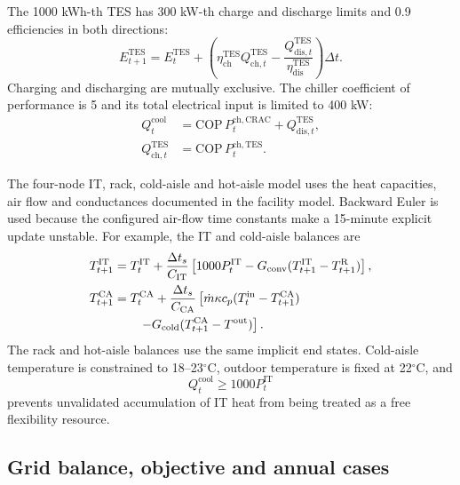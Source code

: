 The 1000 kWh-th TES has 300 kW-th charge and discharge limits and 0.9
efficiencies in both directions:
\begin{equation}
 E^{\mathrm{TES}}_{t+1}=E^{\mathrm{TES}}_t+
 \left(\eta^{\mathrm{TES}}_{\mathrm{ch}}Q^{\mathrm{TES}}_{\mathrm{ch},t}
 -\frac{Q^{\mathrm{TES}}_{\mathrm{dis},t}}
 {\eta^{\mathrm{TES}}_{\mathrm{dis}}}\right)\Delta t. \label{eq:tes}
\end{equation}
Charging and discharging are mutually exclusive. The chiller coefficient of
performance is 5 and its total electrical input is limited to 400 kW:
\begin{align}
 Q^{\mathrm{cool}}_t&=\mathrm{COP}\,P^{\mathrm{ch,CRAC}}_t+
 Q^{\mathrm{TES}}_{\mathrm{dis},t},\\
 Q^{\mathrm{TES}}_{\mathrm{ch},t}&=\mathrm{COP}\,
 P^{\mathrm{ch,TES}}_t.
\end{align}

The four-node IT, rack, cold-aisle and hot-aisle model uses the heat capacities,
air flow and conductances documented in the facility model. Backward Euler is
used because the configured air-flow time constants make a 15-minute explicit
update unstable. For example, the IT and cold-aisle balances are
\begin{align}
 T^{\mathrm{IT}}_{t+1}&=T^{\mathrm{IT}}_t+\frac{\Delta t_s}{C_{\mathrm{IT}}}
 \left[1000P^{\mathrm{IT}}_t-G_{\mathrm{conv}}
 (T^{\mathrm{IT}}_{t+1}-T^{\mathrm{R}}_{t+1})\right],\\
 T^{\mathrm{CA}}_{t+1}&=T^{\mathrm{CA}}_t+\frac{\Delta t_s}{C_{\mathrm{CA}}}
 \left[\dot m\kappa c_p(T^{\mathrm{in}}_t-T^{\mathrm{CA}}_{t+1})\right.\notag\\
 &\qquad\left.-G_{\mathrm{cold}}
 (T^{\mathrm{CA}}_{t+1}-T^{\mathrm{out}})\right].
\end{align}
The rack and hot-aisle balances use the same implicit end states. Cold-aisle
temperature is constrained to 18--23$^{\circ}$C, outdoor temperature is fixed
at 22$^{\circ}$C, and
\begin{equation}
 Q^{\mathrm{cool}}_t\geq1000P^{\mathrm{IT}}_t
 \label{eq:cooling-rule}
\end{equation}
prevents unvalidated accumulation of IT heat from being treated as a free
flexibility resource.

\subsection{Grid balance, objective and annual cases}

